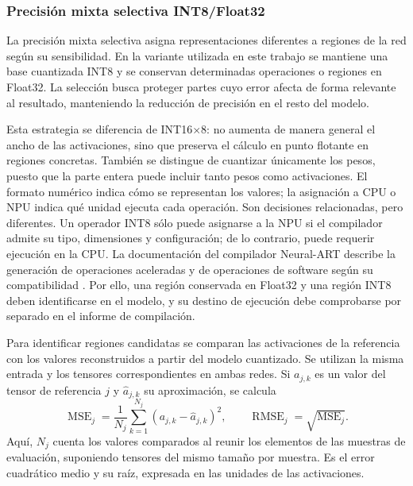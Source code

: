 \subsubsection{Precisión mixta selectiva INT8/Float32}\label{sec:cap3_mixta}
La precisión mixta selectiva asigna representaciones diferentes a regiones de la red según su sensibilidad. En la variante utilizada en este trabajo se mantiene una base cuantizada INT8 y se conservan determinadas operaciones o regiones en Float32. La selección busca proteger partes cuyo error afecta de forma relevante al resultado, manteniendo la reducción de precisión en el resto del modelo.

Esta estrategia se diferencia de INT16$\times$8: no aumenta de manera general el ancho de las activaciones, sino que preserva el cálculo en punto flotante en regiones concretas. También se distingue de cuantizar únicamente los pesos, puesto que la parte entera puede incluir tanto pesos como activaciones. El formato numérico indica cómo se representan los valores; la asignación a CPU o NPU indica qué unidad ejecuta cada operación. Son decisiones relacionadas, pero diferentes. Un operador INT8 sólo puede asignarse a la NPU si el compilador admite su tipo, dimensiones y configuración; de lo contrario, puede requerir ejecución en la CPU. La documentación del compilador Neural-ART describe la generación de operaciones aceleradas y de operaciones de software según su compatibilidad \cite{stcompiler}. Por ello, una región conservada en Float32 y una región INT8 deben identificarse en el modelo, y su destino de ejecución debe comprobarse por separado en el informe de compilación.

Para identificar regiones candidatas se comparan las activaciones de la referencia con los valores reconstruidos a partir del modelo cuantizado. Se utilizan la misma entrada y los tensores correspondientes en ambas redes. Si $a_{j,k}$ es un valor del tensor de referencia $j$ y $\widehat a_{j,k}$ su aproximación, se calcula
\begin{equation}
\operatorname{MSE}_j=\frac{1}{N_j}\sum_{k=1}^{N_j}(a_{j,k}-\widehat a_{j,k})^2,
\qquad \operatorname{RMSE}_j=\sqrt{\operatorname{MSE}_j}.
\label{eq:cap3_rmse}
\end{equation}
Aquí, $N_j$ cuenta los valores comparados al reunir los elementos de las muestras de evaluación, suponiendo tensores del mismo tamaño por muestra. Es el error cuadrático medio y su raíz, expresada en las unidades de las activaciones.


